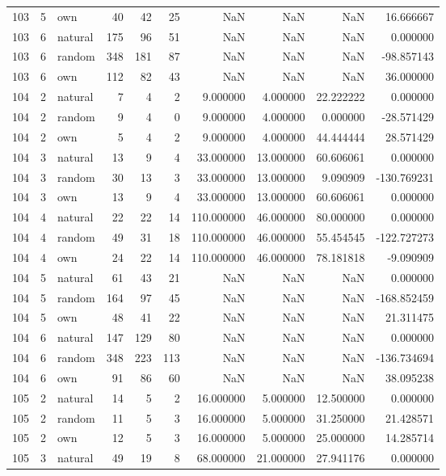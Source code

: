 \begin{table}[htbp]
\begin{tabular}{rrlrrrrrrr}
103 & 5 & own & 40 & 42 & 25 & NaN & NaN & NaN & 16.666667 \\
103 & 6 & natural & 175 & 96 & 51 & NaN & NaN & NaN & 0.000000 \\
103 & 6 & random & 348 & 181 & 87 & NaN & NaN & NaN & -98.857143 \\
103 & 6 & own & 112 & 82 & 43 & NaN & NaN & NaN & 36.000000 \\
104 & 2 & natural & 7 & 4 & 2 & 9.000000 & 4.000000 & 22.222222 & 0.000000 \\
104 & 2 & random & 9 & 4 & 0 & 9.000000 & 4.000000 & 0.000000 & -28.571429 \\
104 & 2 & own & 5 & 4 & 2 & 9.000000 & 4.000000 & 44.444444 & 28.571429 \\
104 & 3 & natural & 13 & 9 & 4 & 33.000000 & 13.000000 & 60.606061 & 0.000000 \\
104 & 3 & random & 30 & 13 & 3 & 33.000000 & 13.000000 & 9.090909 & -130.769231 \\
104 & 3 & own & 13 & 9 & 4 & 33.000000 & 13.000000 & 60.606061 & 0.000000 \\
104 & 4 & natural & 22 & 22 & 14 & 110.000000 & 46.000000 & 80.000000 & 0.000000 \\
104 & 4 & random & 49 & 31 & 18 & 110.000000 & 46.000000 & 55.454545 & -122.727273 \\
104 & 4 & own & 24 & 22 & 14 & 110.000000 & 46.000000 & 78.181818 & -9.090909 \\
104 & 5 & natural & 61 & 43 & 21 & NaN & NaN & NaN & 0.000000 \\
104 & 5 & random & 164 & 97 & 45 & NaN & NaN & NaN & -168.852459 \\
104 & 5 & own & 48 & 41 & 22 & NaN & NaN & NaN & 21.311475 \\
104 & 6 & natural & 147 & 129 & 80 & NaN & NaN & NaN & 0.000000 \\
104 & 6 & random & 348 & 223 & 113 & NaN & NaN & NaN & -136.734694 \\
104 & 6 & own & 91 & 86 & 60 & NaN & NaN & NaN & 38.095238 \\
105 & 2 & natural & 14 & 5 & 2 & 16.000000 & 5.000000 & 12.500000 & 0.000000 \\
105 & 2 & random & 11 & 5 & 3 & 16.000000 & 5.000000 & 31.250000 & 21.428571 \\
105 & 2 & own & 12 & 5 & 3 & 16.000000 & 5.000000 & 25.000000 & 14.285714 \\
105 & 3 & natural & 49 & 19 & 8 & 68.000000 & 21.000000 & 27.941176 & 0.000000 \\

\end{tabular}
\end{table}
